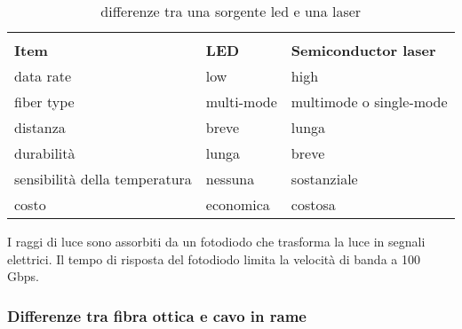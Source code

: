 \documentclass{article}
\begin{document}
\begin{table}[ht]
	\label{sorgenti_luminose}
	\centering
	\begin{tabular}{|l|l|l|}
		\hline
		                              &              &                              \\
		\textbf{Item}                 & \textbf{LED} & \textbf{Semiconductor laser} \\
		\hline
		data rate                     & low          & high                         \\
		fiber type                    & multi-mode   & multimode o single-mode      \\
		distanza                      & breve        & lunga                        \\
		durabilità                    & lunga        & breve                        \\
		sensibilità della temperatura & nessuna      & sostanziale                  \\
		costo                         & economica    & costosa                      \\
		\hline
	\end{tabular}
	\caption{differenze tra una sorgente led e una laser}
\end{table}

I raggi di luce sono assorbiti da un fotodiodo che trasforma la luce in segnali
elettrici. Il tempo di risposta del fotodiodo limita la velocità di banda a 100
Gbps.\\

\subsubsection{Differenze tra fibra ottica e cavo in rame}
\end{document}
